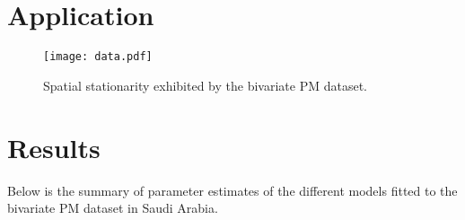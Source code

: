 \documentclass[12pt]{article}
\newcommand{\0}{\mathbf{0}}
\begin{document}
\section{Application}

\begin{figure}[H]
 \centering
\texttt{[image: data.pdf]}
    \caption{\small Spatial stationarity exhibited by the bivariate PM dataset.}
    \label{fig:data}
\end{figure}

\section{Results}

Below is the summary of parameter estimates of the different models fitted to the bivariate PM dataset in Saudi Arabia.
\end{document}
